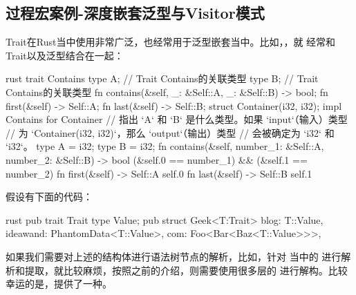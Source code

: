\subsection{过程宏案例-深度嵌套泛型与Visitor模式}
Trait在Rust当中使用非常广泛，也经常用于泛型嵌套当中。比如，，就
经常和Trait以及泛型结合在一起：
\begin{code-block}{rust}
trait Contains {
    type A; // Trait Contains的关联类型
    type B; // Trait Contains的关联类型
    fn contains(&self, _: &Self::A, _: &Self::B) -> bool;
    fn first(&self) -> Self::A;
    fn last(&self) -> Self::B;
}
struct Container(i32, i32);
impl Contains for Container {
    // 指出 `A` 和 `B` 是什么类型。如果 `input`（输入）类型
    // 为 `Container(i32, i32)`，那么 `output`（输出）类型
    // 会被确定为 `i32` 和 `i32`。
    type A = i32;
    type B = i32;
    fn contains(&self, number_1: &Self::A, number_2: &Self::B) -> bool {
        (&self.0 == number_1) && (&self.1 == number_2)
    }
    fn first(&self) -> Self::A { self.0 }
    fn last(&self) -> Self::B { self.1 }
}
\end{code-block}

假设有下面的代码：
\begin{code-block}{rust}
pub trait Trait { type Value; }
pub struct Geek<T:Trait> {
    blog: T::Value,
    ideawand: PhantomData<T::Value>,
    com: Foo<Bar<Baz<T::Value>>>,
}
\end{code-block}
如果我们需要对上述的结构体进行语法树节点的解析，比如，针对
当中的
进行解析和提取，就比较麻烦，按照之前的介绍，则需要使用很多层的
进行解构。比较幸运的是，提供了一种。

